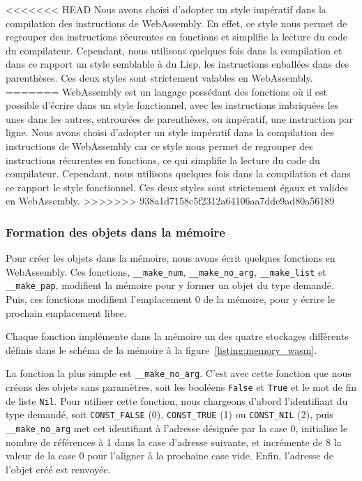 \documentclass{rapportECL}
\begin{document}
<<<<<<< HEAD
Nous avons choisi d'adopter un style impératif dans la compilation des instructions de WebAssembly. En effet, ce style nous permet 
de regrouper des instructions récurentes en fonctions et simplifie la lecture du code du compilateur. Cependant, nous utilisons
quelques fois dans la compilation et dans ce rapport un style semblable à du Lisp, les instructions enballées dans des parenthèses.
Ces deux styles sont strictement valables en WebAssembly.
=======
WebAssembly est un langage possédant des fonctions où il est possible d'écrire dans un style fonctionnel, avec les instructions 
imbriquées les unes dans les autres, entrourées de parenthèses, ou impératif, une instruction par ligne.
Nous avons choisi d'adopter un style impératif dans la compilation des instructions de WebAssembly car ce style nous permet 
de regrouper des instructions récurentes en fonctions, ce qui simplifie la lecture du code du compilateur. Cependant, nous utilisons
quelques fois dans la compilation et dans ce rapport le style fonctionnel.
Ces deux styles sont strictement égaux et valides en WebAssembly.
>>>>>>> 938a1d7158c5f2312a64106aa7dde9ad80a56189

\subsubsection{Formation des objets dans la mémoire}

Pour créer les objets dans la mémoire, nous avons écrit quelques fonctions en WebAssembly.
Ces fonctions, \verb|__make_num|, \verb|__make_no_arg|, \verb|__make_list| et \verb|__make_pap|, modifient la mémoire
pour y former un objet du type demandé. Puis, ces fonctions modifient l'emplacement 0 de la mémoire, pour y écrire le
prochain emplacement libre. 

Chaque fonction implémente dans la mémoire un des quatre stockages différents définis dans le schéma de la 
mémoire à la figure~\ref{listing:memory_wasm}.

\bigskip

La fonction la plus simple est \verb|__make_no_arg|. C'est avec cette fonction que nous créons des objets sans paramètres,
soit les booléens \verb|False| et \verb|True| et le mot de fin de liste \verb|Nil|. Pour utiliser cette fonction,
nous chargeons d'abord l'identifiant du type demandé, soit \verb|CONST_FALSE| (0), \verb|CONST_TRUE| (1) ou \verb|CONST_NIL| (2),
puis \verb|__make_no_arg| met cet identifiant à l'adresse désignée par la case 0, initialise le nombre de références à 1 dans la
case d'adresse suivante, et incrémente de 8 la valeur de la case 0 pour l'aligner à la prochaine case vide. 
Enfin, l'adresse de l'objet créé est renvoyée.
\end{document}
